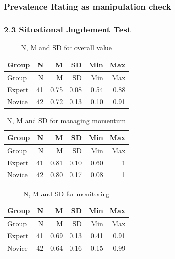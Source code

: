 \documentclass[
]{article}
\begin{document}
\subsubsection{Prevalence Rating as manipulation
check}\label{prevalence-rating-as-manipulation-check}

\subsubsection{2.3 Situational Jugdement
Test}\label{situational-jugdement-test}

\begin{longtable}[]{@{}lrrrrr@{}}
\caption{N, M and SD for overall value}\tabularnewline
\toprule\noalign{}
Group & N & M & SD & Min & Max \\
\midrule\noalign{}
\endfirsthead
\toprule\noalign{}
Group & N & M & SD & Min & Max \\
\midrule\noalign{}
\endhead
\bottomrule\noalign{}
\endlastfoot
Expert & 41 & 0.75 & 0.08 & 0.54 & 0.88 \\
Novice & 42 & 0.72 & 0.13 & 0.10 & 0.91 \\
\end{longtable}

\begin{longtable}[]{@{}lrrrrr@{}}
\caption{N, M and SD for managing momentum}\tabularnewline
\toprule\noalign{}
Group & N & M & SD & Min & Max \\
\midrule\noalign{}
\endfirsthead
\toprule\noalign{}
Group & N & M & SD & Min & Max \\
\midrule\noalign{}
\endhead
\bottomrule\noalign{}
\endlastfoot
Expert & 41 & 0.81 & 0.10 & 0.60 & 1 \\
Novice & 42 & 0.80 & 0.17 & 0.08 & 1 \\
\end{longtable}

\begin{longtable}[]{@{}lrrrrr@{}}
\caption{N, M and SD for monitoring}\tabularnewline
\toprule\noalign{}
Group & N & M & SD & Min & Max \\
\midrule\noalign{}
\endfirsthead
\toprule\noalign{}
Group & N & M & SD & Min & Max \\
\midrule\noalign{}
\endhead
\bottomrule\noalign{}
\endlastfoot
Expert & 41 & 0.69 & 0.13 & 0.41 & 0.91 \\
Novice & 42 & 0.64 & 0.16 & 0.15 & 0.99 \\
\end{longtable}
\end{document}
